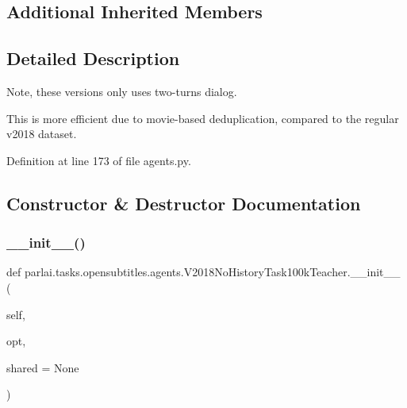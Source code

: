 \subsection*{Additional Inherited Members}


\subsection{Detailed Description}
\begin{DoxyVerb}Note, these versions only uses two-turns dialog.

This is more efficient due to movie-based deduplication, compared to the regular
v2018 dataset.
\end{DoxyVerb}
 

Definition at line 173 of file agents.\+py.



\subsection{Constructor \& Destructor Documentation}
\mbox{\label{classparlai_1_1tasks_1_1opensubtitles_1_1agents_1_1V2018NoHistoryTask100kTeacher_ac0ca125ef0f17779db17f4ad044294e6}} 
\subsubsection{\texorpdfstring{\+\_\+\+\_\+init\+\_\+\+\_\+()}{\_\_init\_\_()}}
{\footnotesize\ttfamily def parlai.\+tasks.\+opensubtitles.\+agents.\+V2018\+No\+History\+Task100k\+Teacher.\+\_\+\+\_\+init\+\_\+\+\_\+ (\begin{DoxyParamCaption}\item[{}]{self,  }\item[{}]{opt,  }\item[{}]{shared = {\ttfamily None} }\end{DoxyParamCaption})}



